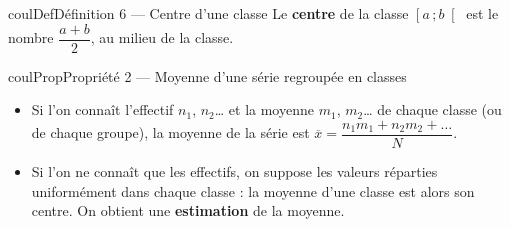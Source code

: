 \documentclass[11pt,a4paper]{article}
\makeatletter
\newcommand{\lycee@intfo}[2]{\left[#1\,;#2\right[}
\providecommand{\intfo}{\lycee@intfo}%
\newcounter{lycee@signet}
\newcommand{\signet}[3][]{\stepcounter{lycee@signet}%
  \edef\lycee@dest{\if\relax\detokenize{#1}\relax
    signet.\arabic{lycee@signet}\else#1\fi}%
  \hypertarget{\lycee@dest}{}\bookmark[level=#2,dest=\lycee@dest]{#3}}
\newenvironment{definitionbox}[1][Définition]%
  {\begin{boitecours}[phantom={\signet{2}{#1}}]{coulDef}{#1}}{\end{boitecours}}
\newenvironment{proprietebox}[1][Propriété]%
  {\begin{boitecours}[phantom={\signet{2}{#1}}]{coulProp}{#1}}{\end{boitecours}}
\makeatother
\begin{document}
\begin{definitionbox}[Définition 6 --- Centre d'une classe]
Le \textbf{centre} de la classe $\intfo{a}{b}$ est le nombre $\dfrac{a+b}{2}$, au
milieu de la classe.
\end{definitionbox}

\begin{proprietebox}[Propriété 2 --- Moyenne d'une série regroupée en classes]
\begin{itemize}
  \item Si l'on connaît l'effectif $n_1$, $n_2$\ldots{} et la moyenne $m_1$,
    $m_2$\ldots{} de chaque classe (ou de chaque groupe), la moyenne de la série est
    $\overline{x}=\dfrac{n_1m_1+n_2m_2+\dots}{N}$.
  \item Si l'on ne connaît que les effectifs, on suppose les valeurs réparties
    uniformément dans chaque classe : la moyenne d'une classe est alors son centre.
    On obtient une \textbf{estimation} de la moyenne.
\end{itemize}
\end{proprietebox}
\end{document}
